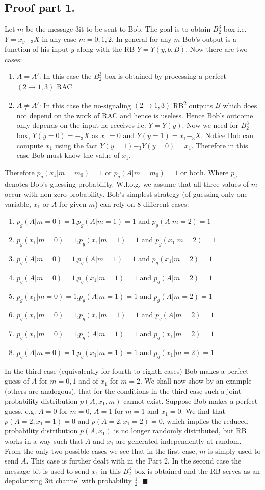 \subsection*{Proof part 1.}
Let $m$ be the message $3$it to be sent to Bob. The goal is to obtain  $B^3_2$-box i.e. $Y=x_y-_3X$ in any case $m=0,1,2$. In general for any $m$ Bob's output is a function of his input $y$ along with the RB $Y=Y(y,b,B)$. Now there are two cases:
\begin{enumerate}
\item \textbf{$A=A'$}: In this case the $B^3_2$-box is obtained by processing a perfect $(2\rightarrow 1,3)$ RAC.
\item \textbf{$A\neq A'$}: In this case the no-signaling $(2\rightarrow 1,3)$ RB\textsuperscript{2} outputs $B$ which does not depend on the work of RAC and hence is useless. Hence Bob's outcome only depends on the input he receives i.e. $Y=Y(y)$. Now we need for  $B^3_2$-box, $Y(y=0)=-_3X$ as $x_0=0$ and $Y(y=1)=x_1-_3X$. Notice Bob can compute $x_1$ using the fact $Y(y=1)-_3Y(y=0)=x_1$. Therefore in this case Bob must know the value of $x_1$.  
\end{enumerate}
Therefore $p_g(x_1|m=m_0)=1$ or $p_g(A|m=m_0)=1$ or both. Where $p_g$ denotes Bob's guessing probability. W.l.o.g. we assume that all three values of $m$ occur with non-zero probability. Bob's simplest strategy (of guessing only one variable, $x_1$ or $A$ for given $m$) can rely on 8 different cases:
\begin{enumerate}
\item $p_g(A|m=0)=1$,$p_g(A|m=1)=1$ and $p_g(A|m=2)=1$
\item $p_g(x_1|m=0)=1$,$p_g(x_1|m=1)=1$ and $p_g(x_1|m=2)=1$
\item $p_g(A|m=0)=1$,$p_g(A|m=1)=1$ and $p_g(x_1|m=2)=1$
\item $p_g(A|m=0)=1$,$p_g(x_1|m=1)=1$ and $p_g(A|m=2)=1$
\item $p_g(x_1|m=0)=1$,$p_g(A|m=1)=1$ and $p_g(A|m=2)=1$
\item $p_g(x_1|m=0)=1$,$p_g(x_1|m=1)=1$ and $p_g(A|m=2)=1$
\item $p_g(x_1|m=0)=1$,$p_g(A|m=1)=1$ and $p_g(x_1|m=2)=1$
\item $p_g(A|m=0)=1$,$p_g(x_1|m=1)=1$ and $p_g(x_1|m=2)=1$
\end{enumerate}
In the third case (equivalently for fourth to eighth cases) Bob makes a perfect guess of $A$ for $m=0,1$ and of $x_1$ for $m=2$. We shall now show by an example (others are analogous), that for the conditions in the third case such a joint probability distribution $p(A,x_1,m)$ cannot exist. Suppose Bob makes a perfect guess, e.g. $A=0$ for $m=0$, $A=1$ for $m=1$ and $x_1=0$. We find that $p(A=2,x_1=1)=0$ and $p(A=2,x_1=2)=0$, which implies the reduced probability distribution $p(A,x_1)$ is no longer randomly distributed, but RB works in a way such that $A$ and $x_1$ are generated independently at random.\\
From the only two possible cases we see that in the first case, $m$ is simply used to send $A$. This case is further dealt with in the Part 2. In the second case the message bit is used to send $x_1$ in this $B^3_2$ box is obtained and the RB serves as an depolarizing $3$it channel with probability $\frac{1}{2}$. $\blacksquare$ 
